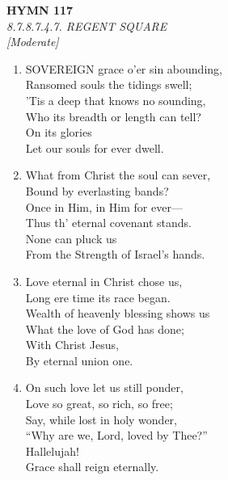 \newpage
\begin{center}
    {\Large \textbf{HYMN 117}}
    \\
    \textit{8.7.8.7.4.7. REGENT SQUARE}
    \\
    \textit{\small [Moderate]}
\end{center}
\vspace{1em}

\begin{enumerate}
    \item SOVEREIGN grace o'er sin abounding, \\
        Ransomed souls the tidings swell; \\
        'Tis a deep that knows no sounding, \\
        Who its breadth or length can tell? \\
        On its glories \\
        Let our souls for ever dwell.

    \item What from Christ the soul can sever, \\
        Bound by everlasting bands? \\
        Once in Him, in Him for ever--- \\
        Thus th' eternal covenant stands. \\
        None can pluck us \\
        From the Strength of Israel's hands.

    \item Love eternal in Christ chose us, \\
        Long ere time its race began. \\
        Wealth of heavenly blessing shows us \\
        What the love of God has done; \\
        With Christ Jesus, \\
        By eternal union one.

    \item On such love let us still ponder, \\
        Love so great, so rich, so free; \\
        Say, while lost in holy wonder, \\
        ``Why are we, Lord, loved by Thee?'' \\
        Hallelujah! \\
        Grace shall reign eternally.

\end{enumerate}

